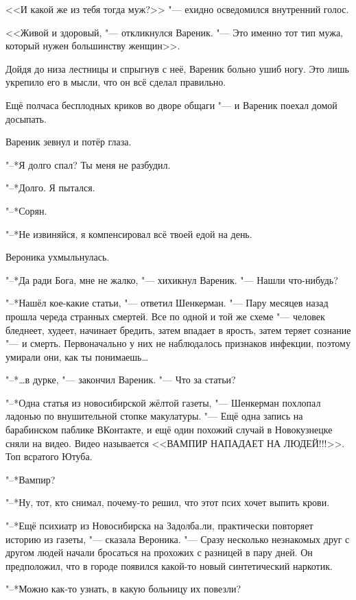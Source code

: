 <<И какой же из тебя тогда муж?>> "--- ехидно осведомился внутренний голос.

<<Живой и здоровый, "--- откликнулся Вареник.
"--- Это именно тот тип мужа, который нужен большинству женщин>>.

Дойдя до низа лестницы и спрыгнув с неё, Вареник больно ушиб ногу.
Это лишь укрепило его в мысли, что он всё сделал правильно.

Ещё полчаса бесплодных криков во дворе общаги "--- и Вареник поехал домой досыпать.

\asterism

\textspace

Вареник зевнул и потёр глаза.

"--*Я долго спал?
Ты меня не разбудил.

"--*Долго.
Я пытался.

"--*Сорян.

"--*Не извиняйся, я компенсировал всё твоей едой на день.

Вероника ухмыльнулась.

"--*Да ради Бога, мне не жалко, "--- хихикнул Вареник.
"--- Нашли что-нибудь?

"--*Нашёл кое-какие статьи, "--- ответил Шенкерман.
"--- Пару месяцев назад прошла череда странных смертей.
Все по одной и той же схеме "--- человек бледнеет, худеет, начинает бредить, затем впадает в ярость, затем теряет сознание "--- и смерть.
Первоначально у них не наблюдалось признаков инфекции, поэтому умирали они, как ты понимаешь\dots{}

"--*\dots{}в дурке, "--- закончил Вареник.
"--- Что за статьи?

"--*Одна статья из новосибирской жёлтой газеты, "--- Шенкерман похлопал ладонью по внушительной стопке макулатуры.
"--- Ещё одна запись на барабинском паблике ВКонтакте, и ещё один похожий случай в Новокузнецке сняли на видео.
Видео называется <<ВАМПИР НАПАДАЕТ НА ЛЮДЕЙ!!!>>.
Топ всратого Ютуба.

"--*Вампир?

"--*Ну, тот, кто снимал, почему-то решил, что этот псих хочет выпить крови.

"--*Ещё психиатр из Новосибирска на Задолба.ли, практически повторяет историю из газеты, "--- сказала Вероника.
"--- Сразу несколько незнакомых друг с другом людей начали бросаться на прохожих с разницей в пару дней.
Он предположил, что в городе появился какой-то новый синтетический наркотик.

"--*Можно как-то узнать, в какую больницу их повезли?

